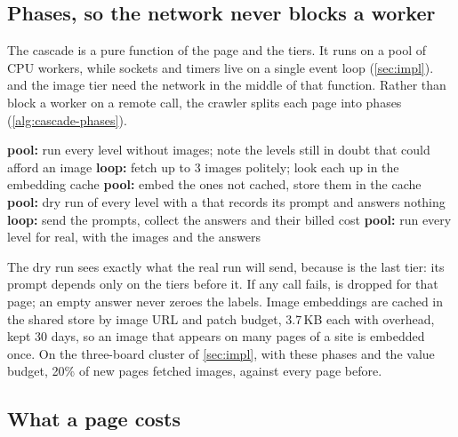 \subsection{Phases, so the network never blocks a worker}\label{sec:cascade-phases}

The cascade is a pure function of the page and the tiers. It runs on a pool of CPU workers, while sockets and timers live on a single event loop (\cref{sec:impl}).  and the image tier need the network in the middle of that function. Rather than block a worker on a remote call, the crawler splits each page into phases (\cref{alg:cascade-phases}).

\begin{algorithm}[t]
\caption{One page's levels, with network work kept out of the CPU pool.}
\label{alg:cascade-phases}
\begin{algorithmic}[1]
\State \textbf{pool:} run every level without images; note the levels still in doubt that could afford an image
  \State \textbf{loop:} fetch up to 3 images politely; look each up in the embedding cache
  \State \textbf{pool:} embed the ones not cached, store them in the cache
\EndIf
\State \textbf{pool:} dry run of every level with a  that records its prompt and answers nothing
  \State \textbf{loop:} send the prompts, collect the answers and their billed cost
\EndIf
\State \textbf{pool:} run every level for real, with the images and the answers
\end{algorithmic}
\end{algorithm}

The dry run sees exactly what the real run will send, because  is the last tier: its prompt depends only on the tiers before it. If any call fails,  is dropped for that page; an empty answer never zeroes the labels. Image embeddings are cached in the shared store by image URL and patch budget, 3.7\,KB each with overhead, kept 30 days, so an image that appears on many pages of a site is embedded once. On the three-board cluster of \cref{sec:impl}, with these phases and the value budget, 20\% of new pages fetched images, against every page before.

\subsection{What a page costs}\label{sec:cascade-cost}

